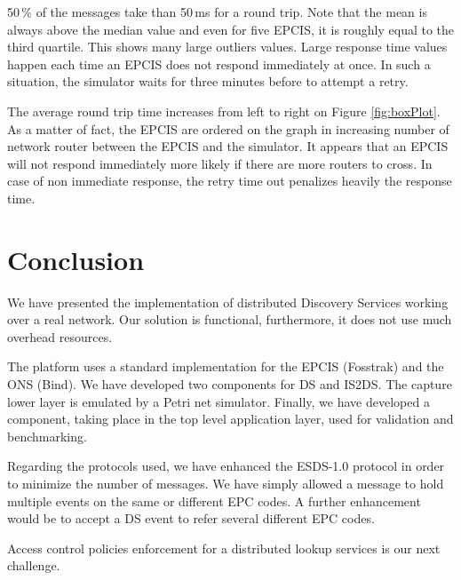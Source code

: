\documentclass[a4paper]{llncs}
\begin{document}
50\,\% of the messages take than 50\,ms for a round trip. Note that the mean is
always above the median value and even for five EPCIS, it is roughly equal to
the third quartile. This shows many large outliers values. Large response time
values happen each time an EPCIS does not respond immediately at once. In such
a situation, the simulator waits for three minutes before to attempt a retry.

The average round trip time increases from left to right on Figure
\ref{fig:boxPlot}. As a matter of fact, the EPCIS are ordered on the graph in
increasing number of network router between the EPCIS and the
simulator. It appears that an EPCIS will not respond immediately more likely if
there are more routers to cross. In case of non immediate response, 
the retry time out penalizes heavily the response time. 


\section{Conclusion}

We have presented the implementation of distributed Discovery Services working
over a real network. Our solution is functional, furthermore, it does not use
much overhead resources. 
 
The platform uses a standard implementation for the  EPCIS (Fosstrak) and the
ONS (Bind). We have developed two components for DS and IS2DS. The capture
lower layer is emulated by a Petri net simulator. Finally, we have developed a
component, taking place in the top level application layer, used for validation
and benchmarking.
  
Regarding the protocols used, we have enhanced the ESDS-1.0 protocol in order
to minimize the number of messages. We have simply allowed a message to hold
multiple events on the same or different EPC codes. A further enhancement would
be to accept a DS event to refer several different EPC codes. 

Access control policies enforcement for a distributed  lookup services is our
next challenge.



\end{document}
